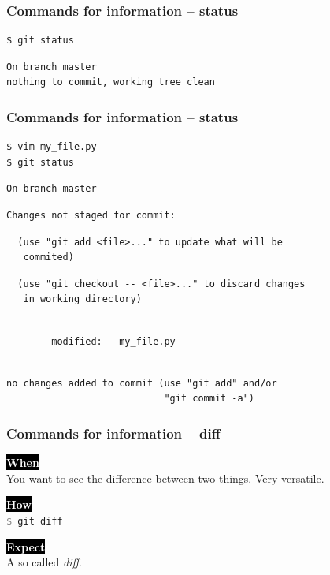 \documentclass{beamer}
\newcommand{\keyword}[1]{\hspace{-1.0em}\colorbox{black}{\textcolor{white}{\textbf{#1}\vphantom{Ep}}}\vspace{0.2em}} %
\newcommand{\command}[1]{\texttt{\textcolor{gray}{\$} {#1}}}
\begin{document}
\begin{frame}[fragile]
  \frametitle{Commands for information -- status}

\begin{verbatim}
$ git status
\end{verbatim}
\pause{}
\begin{verbatim}
On branch master
nothing to commit, working tree clean
\end{verbatim}
\end{frame}

\begin{frame}[fragile]
  \frametitle{Commands for information -- status}

\begin{verbatim}
$ vim my_file.py
$ git status
\end{verbatim}
\pause{}
\vspace{-3.5ex}
\begin{verbatim}
On branch master
\end{verbatim}
\pause{}
\vspace{-3.5ex}
\begin{verbatim}
Changes not staged for commit:
\end{verbatim}
\pause{}
\vspace{-3.5ex}
\begin{verbatim}
  (use "git add <file>..." to update what will be
   commited)
\end{verbatim}
\pause{}
\vspace{-3.5ex}
\begin{verbatim}
  (use "git checkout -- <file>..." to discard changes
   in working directory)
\end{verbatim}
\pause{}
\vspace{-3.5ex}
\begin{verbatim}

        modified:   my_file.py
\end{verbatim}
\pause{}
\vspace{-3.5ex}
\begin{verbatim}

no changes added to commit (use "git add" and/or
                            "git commit -a")
\end{verbatim}
\end{frame}

\begin{frame}
  \frametitle{Commands for information -- diff}

  \keyword{When}\\
  You want to see the difference between two things. Very versatile.
  \vspace{0.5em}

  \keyword{How}\\
  \command{git diff}
  \vspace{0.5em}

  \keyword{Expect}\\
  A so called \emph{diff}.
\end{frame}
\end{document}

